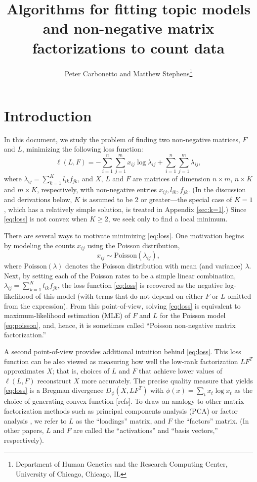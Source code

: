 \documentclass[final]{siamart171218}
\title{Algorithms for fitting topic models and non-negative matrix 
  factorizations to count data}
\author{Peter Carbonetto and Matthew Stephens\thanks{Department of 
  Human Genetics and the Research Computing Center, University of 
  Chicago, Chicago, IL}}
\begin{document}
\maketitle

\section{Introduction}

In this document, we study the problem of finding two non-negative
matrices, $F$ and $L$, minimizing the following loss function:
\begin{equation}
\ell(L,F) = 
-\sum_{i=1}^n \sum_{j=1}^m x_{ij} \log \lambda_{ij} + 
\sum_{i=1}^n \sum_{j=1}^m \lambda_{ij},
\label{eq:loss}
\end{equation}
where $\lambda_{ij} = \sum_{k=1}^K l_{ik} f_{jk}$, and $X$, $L$ and
$F$ are matrices of dimension $n \times m$, $n \times K$ and $m \times
K$, respectively, with non-negative entries $x_{ij}, l_{ik}, f_{jk}$.
(In the discussion and derivations below, $K$ is assumed to be 2 or
greater---the special case of $K = 1$, which has a relatively simple
solution, is treated in Appendix \ref{sec:k=1}.) Since \eqref{eq:loss}
is not convex when $K \geq 2$, we seek only to find a local minimum.

There are several ways to motivate minimizing \eqref{eq:loss}. One
motivation begins by modeling the counts $x_{ij}$ using the Poisson
distribution,
\begin{equation}
x_{ij} \sim \mathrm{Poisson}(\lambda_{ij}),
\label{eq:poisson}
\end{equation}
where $\mathrm{Poisson}(\lambda)$ denotes the Poisson distribution
with mean (and variance) $\lambda$. Next, by setting each of the
Poisson rates to be a simple linear combination, $\lambda_{ij} =
\sum_{k=1}^K l_{ik} f_{jk}$, the loss function \eqref{eq:loss} is
recovered as the negative log-likelihood of this model (with terms
that do not depend on either $F$ or $L$ omitted from the
expression). From this point-of-view, solving \eqref{eq:loss} is
equivalent to maximum-likelihood estimation (MLE) of $F$ and $L$ for
the Poisson model \eqref{eq:poisson}, and, hence, it is sometimes called
``Poisson non-negative matrix factorization.''

A second point-of-view provides additional intuition behind
\eqref{eq:loss}. This loss function can be also viewed as measuring
how well the low-rank factorization $LF^T$ approximates $X$; that is,
choices of $L$ and $F$ that achieve lower values of $\ell(L,F)$
reconstruct $X$ more accurately. The precise quality measure that
yields \eqref{eq:loss} is a Bregman divergence $D_{\phi}(X, LF^T)$
\cite{bregman-1967} with $\phi(x) = \sum_t x_t \log x_t$ as the choice
of generating convex function [refs]. To draw an analogy to other
matrix factorization methods such as principal components analysis
(PCA) or factor analysis \cite{engelhardt-stephens-2010}, we refer to
$L$ as the ``loadings'' matrix, and $F$ the ``factors'' matrix. (In
other papers, $L$ and $F$ are called the ``activations'' and ``basis
vectors,'' respectively).
\end{document}
